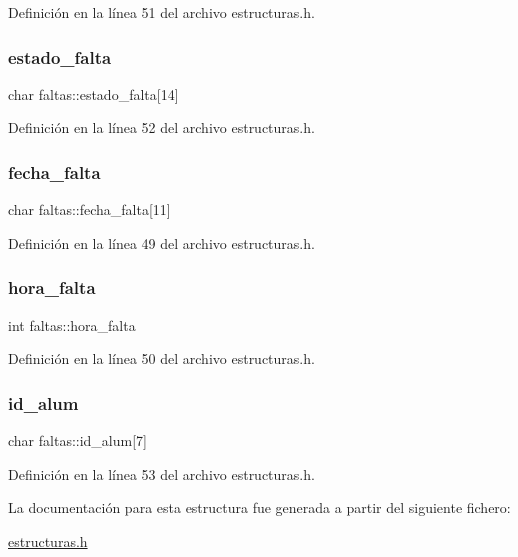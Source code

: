 Definición en la línea 51 del archivo estructuras.\+h.

\mbox{\label{structfaltas_abcd66e5b1e7f572c68cfc2d860289ee3}} 
\subsubsection{\texorpdfstring{estado\+\_\+falta}{estado\_falta}}
{\footnotesize\ttfamily char faltas\+::estado\+\_\+falta\mbox{[}14\mbox{]}}



Definición en la línea 52 del archivo estructuras.\+h.

\mbox{\label{structfaltas_af129c434d523f950657f329ee13598b5}} 
\subsubsection{\texorpdfstring{fecha\+\_\+falta}{fecha\_falta}}
{\footnotesize\ttfamily char faltas\+::fecha\+\_\+falta\mbox{[}11\mbox{]}}



Definición en la línea 49 del archivo estructuras.\+h.

\mbox{\label{structfaltas_a896bc2033259f82ae633907298b3a65d}} 
\subsubsection{\texorpdfstring{hora\+\_\+falta}{hora\_falta}}
{\footnotesize\ttfamily int faltas\+::hora\+\_\+falta}



Definición en la línea 50 del archivo estructuras.\+h.

\mbox{\label{structfaltas_adf78bf54f25af0e394df78fc3ef765fa}} 
\subsubsection{\texorpdfstring{id\+\_\+alum}{id\_alum}}
{\footnotesize\ttfamily char faltas\+::id\+\_\+alum\mbox{[}7\mbox{]}}



Definición en la línea 53 del archivo estructuras.\+h.



La documentación para esta estructura fue generada a partir del siguiente fichero\+:\begin{DoxyCompactItemize}
\item 
\mbox{\hyperlink{estructuras_8h}{estructuras.\+h}}\end{DoxyCompactItemize}
